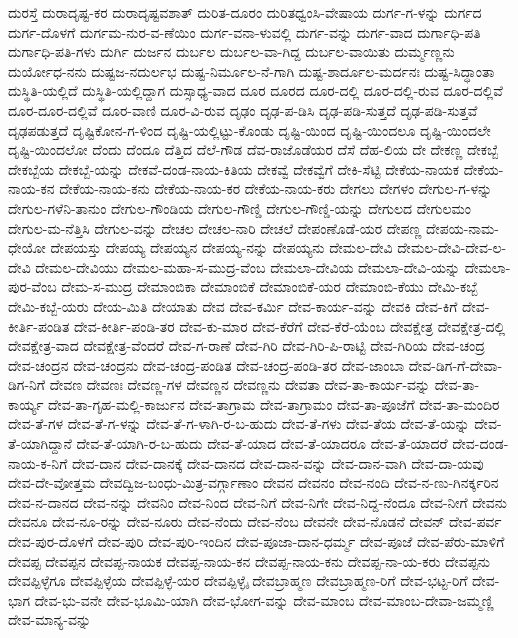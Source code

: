 ದುರಸ್ತೆ
ದುರಾದೃಷ್ಟ-ಕರ
ದುರಾದೃಷ್ಟವಶಾತ್
ದುರಿತ-ದೂರಂ
ದುರಿತಧ್ವಂಸಿ-ವೇಷಾಯ
ದುರ್ಗ-ಗ-ಳನ್ನು
ದುರ್ಗದ
ದುರ್ಗ-ದೊಳಗೆ
ದುರ್ಗಮ-ನುರ-ವ-ಣೆಯಿಂ
ದುರ್ಗ-ವನಾ-ಳುವಲ್ಲಿ
ದುರ್ಗ-ವನ್ನು
ದುರ್ಗ-ವಾದ
ದುರ್ಗಾಧಿ-ಪತಿ
ದುರ್ಗಾಧಿ-ಪತಿ-ಗಳು
ದುರ್ಗಿ
ದುರ್ಜನ
ದುರ್ಬಲ
ದುರ್ಬಲ-ವಾ-ಗಿದ್ದ
ದುರ್ಬಲ-ವಾಯಿತು
ದುರ್ಮ್ಮಣ್ಣನು
ದುರ್ಯೋಧ-ನನು
ದುಷ್ಟಜ-ನದುರ್ಲಭ
ದುಷ್ಟ-ನಿರ್ಮೂಲ-ನೆ-ಗಾಗಿ
ದುಷ್ಟ-ಶಾರ್ದೂಲ-ಮರ್ದನಃ
ದುಷ್ಟ-ಸಿದ್ಧಾಂತಾ
ದುಸ್ಥಿತಿ-ಯಲ್ಲಿದೆ
ದುಸ್ಥಿತಿ-ಯಲ್ಲಿದ್ದಾಗ
ದುಸ್ಸಾಧ್ಯ-ವಾದ
ದೂರ
ದೂರದ
ದೂರ-ದಲ್ಲಿ
ದೂರ-ದಲ್ಲಿ-ರುವ
ದೂರ-ದಲ್ಲಿವೆ
ದೂರ-ದೂರ-ದಲ್ಲಿವೆ
ದೂರ-ವಾಣಿ
ದೂರ-ವಿ-ರುವ
ದೃಢಂ
ದೃಢ-ಪ-ಡಿಸಿ
ದೃಢ-ಪಡಿ-ಸುತ್ತದೆ
ದೃಢ-ಪಡಿ-ಸುತ್ತವೆ
ದೃಢಪಡುತ್ತದೆ
ದೃಷ್ಟಿಕೋನ-ಗ-ಳಿಂದ
ದೃಷ್ಟಿ-ಯಲ್ಲಿಟ್ಟು-ಕೊಂಡು
ದೃಷ್ಟಿ-ಯಿಂದ
ದೃಷ್ಟಿ-ಯಿಂದಲೂ
ದೃಷ್ಟಿ-ಯಿಂದಲೇ
ದೃಷ್ಟಿ-ಯಿಂದಲೋ
ದೆಂದು
ದೆಂದೂ
ದೆತ್ತಿದ
ದೆಲೆ-ಗೌಡ
ದೆವ-ರಾಜೊಡೆಯರ
ದೆಸೆ
ದೆಹ-ಲಿಯ
ದೇ
ದೇಕಣ್ಣ
ದೇಕಬ್ಬೆ
ದೇಕಬ್ಬೆಯ
ದೇಕಬ್ಬೆ-ಯನ್ನು
ದೇಕವೆ-ದಂಡ-ನಾಯ-ಕಿತಿಯ
ದೇಕವ್ವೆ
ದೇಕವ್ವೆಗೆ
ದೇಕಿ-ಸೆಟ್ಟಿ
ದೇಕೆಯ-ನಾಯಕ
ದೇಕೆಯ-ನಾಯ-ಕನ
ದೇಕೆಯ-ನಾಯ-ಕನು
ದೇಕೆಯ-ನಾಯ-ಕರ
ದೇಕೆಯ-ನಾಯ-ಕರು
ದೇಗಲು
ದೇಗಳಂ
ದೇಗುಲ-ಗ-ಳನ್ನು
ದೇಗುಲ-ಗಳೆನಿ-ತಾನುಂ
ದೇಗುಲ-ಗೌಂಡಿಯ
ದೇಗುಲ-ಗೌಣ್ಡಿ
ದೇಗುಲ-ಗೌಣ್ಡಿ-ಯನ್ನು
ದೇಗುಲದ
ದೇಗುಲಮಂ
ದೇಗುಲ-ಮ-ನೆತ್ತಿಸಿ
ದೇಗುಲ-ವನ್ನು
ದೇಚಲ
ದೇಚಲ-ನಾರಿ
ದೇಚಲೆ
ದೇಪಂಣೊಡೆ-ಯರ
ದೇಪಣ್ಣ
ದೇಪಯ-ನಾಮ-ಧೇಯೋ
ದೇಪಯಸ್ತು
ದೇಪಯ್ಯ
ದೇಪಯ್ಯನ
ದೇಪಯ್ಯ-ನನ್ನು
ದೇಪಯ್ಯನು
ದೇಮಲ-ದೇವಿ
ದೇಮಲ-ದೇವಿ-ದೇವ-ಲ-ದೇವಿ
ದೇಮಲ-ದೇವಿಯು
ದೇಮಲ-ಮಹಾ-ಸ-ಮುದ್ರ-ವೆಂಬ
ದೇಮಲಾ-ದೇವಿಯ
ದೇಮಲಾ-ದೇವಿ-ಯನ್ನು
ದೇಮಲಾ-ಪುರ-ವೆಂಬ
ದೇಮ-ಸ-ಮುದ್ರ
ದೇಮಾಂಬಿಕಾ
ದೇಮಾಂಬಿಕೆ
ದೇಮಾಂಬಿಕೆ-ಯರ
ದೇಮಾಂಬಿ-ಕೆಯು
ದೇಮಿ-ಕಬ್ಬೆ
ದೇಮಿ-ಕಬ್ಬೆ-ಯರು
ದೇಯ-ಮಿತಿ
ದೇಯಾತು
ದೇವ
ದೇವ-ಕರ್ಮಿ
ದೇವ-ಕಾರ್ಯ-ವನ್ನು
ದೇವಕಿ
ದೇವ-ಕಿಗೆ
ದೇವ-ಕೀರ್ತಿ-ಪಂಡಿತ
ದೇವ-ಕೀರ್ತಿ-ಪಂಡಿ-ತರ
ದೇವ-ಕು-ಮಾರ
ದೇವ-ಕೆರೆಗೆ
ದೇವ-ಕೆರೆ-ಯೆಂಬ
ದೇವಕ್ಷೇತ್ರ
ದೇವಕ್ಷೇತ್ರ-ದಲ್ಲಿ
ದೇವಕ್ಷೇತ್ರ-ವಾದ
ದೇವಕ್ಷೇತ್ರ-ವೆಂದರೆ
ದೇವ-ಗ-ರಾಣೆ
ದೇವ-ಗಿರಿ
ದೇವ-ಗಿರಿ-ಪಿ-ರಾಟ್ಟಿ
ದೇವ-ಗಿರಿಯ
ದೇವ-ಚಂದ್ರ
ದೇವ-ಚಂದ್ರನ
ದೇವ-ಚಂದ್ರನು
ದೇವ-ಚಂದ್ರ-ಪಂಡಿತ
ದೇವ-ಚಂದ್ರ-ಪಂಡಿ-ತರ
ದೇವ-ಜಾಂಬಾ
ದೇವ-ಡಿಗ-ಗೆ-ದೇವಾ-ಡಿಗ-ನಿಗೆ
ದೇವಣ
ದೇವಣಃ
ದೇವಣ್ಣ-ಗಳ
ದೇವಣ್ಣನ
ದೇವಣ್ಣನು
ದೇವತಾ
ದೇವ-ತಾ-ಕಾರ್ಯ-ವನ್ನು
ದೇವ-ತಾ-ಕಾರ್ಯ್ಯ
ದೇವ-ತಾ-ಗೃಹ-ಮಲ್ಲಿ-ಕಾರ್ಜುನ
ದೇವ-ತಾಗ್ರಾಮ
ದೇವ-ತಾಗ್ರಾಮಂ
ದೇವ-ತಾ-ಪೂಜೆಗೆ
ದೇವ-ತಾ-ಮಂದಿರ
ದೇವ-ತೆ-ಗಳ
ದೇವ-ತೆ-ಗ-ಳನ್ನು
ದೇವ-ತೆ-ಗ-ಳಾಗಿ-ರ-ಬ-ಹುದು
ದೇವ-ತೆ-ಗಳು
ದೇವ-ತೆಯ
ದೇವ-ತೆ-ಯನ್ನು
ದೇವ-ತೆ-ಯಾಗಿದ್ದಾನೆ
ದೇವ-ತೆ-ಯಾಗಿ-ರ-ಬ-ಹುದು
ದೇವ-ತೆ-ಯಾದ
ದೇವ-ತೆ-ಯಾದರೂ
ದೇವ-ತೆ-ಯಾದರೆ
ದೇವ-ದಂಡ-ನಾಯ-ಕ-ನಿಗೆ
ದೇವ-ದಾನ
ದೇವ-ದಾನಕ್ಕೆ
ದೇವ-ದಾನದ
ದೇವ-ದಾನ-ವನ್ನು
ದೇವ-ದಾನ-ವಾಗಿ
ದೇವ-ದಾ-ಯವು
ದೇವ-ದೇ-ವೋತ್ತಮ
ದೇವದ್ವಿಜ-ಬಂಧು-ಮಿತ್ರ-ವರ್ಗ್ಗಾಣಾಂ
ದೇವನ
ದೇವನಂ
ದೇವ-ನಂದಿ
ದೇವ-ನ-ಣು-ಗಿನರ್ಕ್ಕರಿನ
ದೇವ-ನ-ದಾನದ
ದೇವ-ನನ್ನು
ದೇವನಿಂ
ದೇವ-ನಿಂದ
ದೇವ-ನಿಗೆ
ದೇವ-ನಿಗೇ
ದೇವ-ನಿದ್ದ-ನೆಂದೂ
ದೇವ-ನೀಗೆ
ದೇವನು
ದೇವನೂ
ದೇವ-ನೂ-ರನ್ನು
ದೇವ-ನೂರು
ದೇವ-ನೆಂದು
ದೇವ-ನೆಂಬ
ದೇವನೇ
ದೇವ-ನೊಡನೆ
ದೇವನ್
ದೇವ-ಪರ್ವ
ದೇವ-ಪುರ-ದೊಳಗೆ
ದೇವ-ಪುರಿ
ದೇವ-ಪುರಿ-ಇಂದಿನ
ದೇವ-ಪೂಜಾ-ದಾನ-ಧರ್ಮ್ಮ
ದೇವ-ಪೂಜೆ
ದೇವ-ಪೆರು-ಮಾಳಿಗೆ
ದೇವಪ್ಪ
ದೇವಪ್ಪನ
ದೇವಪ್ಪ-ನಾಯಕ
ದೇವಪ್ಪ-ನಾಯ-ಕನ
ದೇವಪ್ಪ-ನಾಯ-ಕನು
ದೇವಪ್ಪ-ನಾ-ಯ-ಕರು
ದೇವಪ್ಪನು
ದೇವಪ್ಪಿಳ್ಳೆಗೂ
ದೇವಪ್ಪಿಳ್ಳೆಯ
ದೇವಪ್ಪಿಳ್ಳೆ-ಯರ
ದೇವಪ್ಪಿಳ್ಳೈ
ದೇವಬ್ರಾಹ್ಮಣ
ದೇವಬ್ರಾಹ್ಮಣ-ರಿಗೆ
ದೇವ-ಭಟ್ಟ-ರಿಗೆ
ದೇವ-ಭಾಗ
ದೇವ-ಭು-ವನೇ
ದೇವ-ಭೂಮಿ-ಯಾಗಿ
ದೇವ-ಭೋಗ-ವನ್ನು
ದೇವ-ಮಾಂಬ
ದೇವ-ಮಾಂಬ-ದೇವಾ-ಜಮ್ಮಣ್ಣಿ
ದೇವ-ಮಾನ್ಯ-ವನ್ನು
